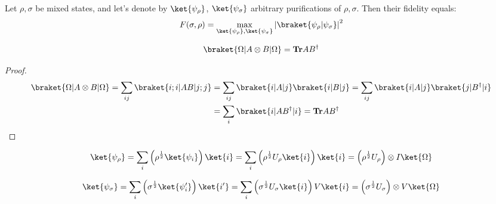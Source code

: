 \documentclass[12pt,a4paper]{article}
\begin{document}
\begin{theorem}
Let $\rho, \sigma$ be mixed states, and let's denote by $\ket{\psi_\rho}$, $\ket{\psi_\sigma}$ arbitrary purifications of $\rho, \sigma$. Then their fidelity equals:
  \begin{equation*}
    \begin{split}
      F(\sigma,\rho) = \max_{\ket{\psi_\rho}, \ket{\psi_\sigma}} \left| \braket{\psi_\rho|\psi_\sigma} \right|^2 
    \end{split}
  \end{equation*}
\end{theorem}


\begin{claim}
  \begin{equation*}
    \begin{split}
    \braket{\Omega| A \otimes B  | \Omega} = \mathbf{Tr} AB^\dagger
    \end{split}
  \end{equation*}
\end{claim}
\begin{proof}
  \begin{equation*}
    \begin{split}
    \braket{\Omega| A \otimes B  | \Omega} = \sum_{ij}{ \braket{ i;i | AB | j ;j } } &=  \sum_{ij}{ \braket{ i| A | j} \braket{i | B | j } } =  \sum_{ij}{ \braket{ i| A | j} \braket{j | B^\dagger | i } } \\ 
      & = \sum_{i}{ \braket{i | A B^\dagger | i } } = \mathbf{Tr} AB^\dagger
    \end{split}
  \end{equation*}
\end{proof}

\begin{equation*}
  \begin{split}
    \ket{\psi_\rho} = \sum_{i}{ \left( \rho^{\frac{1}{2}}\ket{\psi_i} \right) \ket{i} } = \sum_{i}{ \left( \rho^{\frac{1}{2}} U_{\rho} \ket{i} \right) \ket{i} }  =  \left( \rho^{\frac{1}{2}} U_{\rho} \right) \otimes I \ket{ \Omega } \\ 
  \end{split}
\end{equation*}

\begin{equation*}
  \begin{split}
  \ket{\psi_\sigma} = \sum_{i}{ \left( \sigma^{\frac{1}{2}}\ket{\psi^\prime_i} \right) \ket{i^\prime} } =  
  \sum_{i}{ \left( \sigma^{\frac{1}{2}} U_{\sigma} \ket{i} \right)  V \ket{i} }  =  \left( \sigma^{\frac{1}{2}} U_{\sigma} \right) \otimes V \ket{\Omega} 
  \end{split}
\end{equation*}
\end{document}
